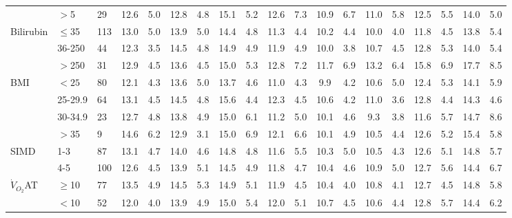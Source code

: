\begin{sidewaystable}[p]
\begin{tabular}{|l ll | cc cc cc cc cc cc cc cc|}
		                    & $>$5      & 29    & 12.6  & 5.0 & 12.8  & 4.8 & 15.1  & 5.2 & 12.6  & 7.3 & 10.9  & 6.7 & 11.0  & 5.8 & 12.5  & 5.5 & 14.0  & 5.0 \\
		Bilirubin           & $\leq$35  & 113   & 13.0  & 5.0 & 13.9  & 5.0 & 14.4  & 4.8 & 11.3  & 4.4 & 10.2  & 4.4 & 10.0  & 4.0 & 11.8  & 4.5 & 13.8  & 5.4 \\
		                    & 36-250    & 44    & 12.3  & 3.5 & 14.5  & 4.8 & 14.9  & 4.9 & 11.9  & 4.9 & 10.0  & 3.8 & 10.7  & 4.5 & 12.8  & 5.3 & 14.0  & 5.4 \\
		                    & $>$250    & 31    & 12.9  & 4.5 & 13.6  & 4.5 & 15.0  & 5.3 & 12.8  & 7.2 & 11.7  & 6.9 & 13.2  & 6.4 & 15.8  & 6.9 & 17.7  & 8.5 \\
		BMI                 & $<25$     & 80    & 12.1  & 4.3 & 13.6  & 5.0 & 13.7  & 4.6 & 11.0  & 4.3 & 9.9   & 4.2 & 10.6  & 5.0 & 12.4  & 5.3 & 14.1  & 5.9 \\
		                    & 25-29.9   & 64    & 13.1  & 4.5 & 14.5  & 4.8 & 15.6  & 4.4 & 12.3  & 4.5 & 10.6  & 4.2 & 11.0  & 3.6 & 12.8  & 4.4 & 14.3  & 4.6 \\
		                    & 30-34.9   & 23    & 12.7  & 4.8 & 13.8  & 4.9 & 15.0  & 6.1 & 11.2  & 5.0 & 10.1  & 4.6 & 9.3   & 3.8 & 11.6  & 5.7 & 14.7  & 8.6 \\
		                    & $>$35     & 9     & 14.6  & 6.2 & 12.9  & 3.1 & 15.0  & 6.9 & 12.1  & 6.6 & 10.1  & 4.9 & 10.5  & 4.4 & 12.6  & 5.2 & 15.4  & 5.8 \\
		SIMD                & 1-3       & 87    & 13.1  & 4.7 & 14.0  & 4.6 & 14.8  & 4.8 & 11.6  & 5.5 & 10.3  & 5.0 & 10.5  & 4.3 & 12.6  & 5.1 & 14.8  & 5.7 \\
		                    & 4-5       & 100   & 12.6  & 4.5 & 13.9  & 5.1 & 14.5  & 4.9 & 11.8  & 4.7 & 10.4  & 4.6 & 10.9  & 5.0 & 12.7  & 5.6 & 14.4  & 6.7 \\
		$\dot{V}_{O_2}$AT   & $\geq$10  & 77    & 13.5  & 4.9 & 14.5  & 5.3 & 14.9  & 5.1 & 11.9  & 4.5 & 10.4  & 4.0 & 10.8  & 4.1 & 12.7  & 4.5 & 14.8  & 5.8 \\
		                    & $<$10     & 52    & 12.0  & 4.0 & 13.9  & 4.9 & 15.0  & 5.4 & 12.0  & 5.1 & 10.7  & 4.5 & 10.6  & 4.4 & 12.8  & 5.7 & 14.4  & 6.2 \\

\end{tabular}
\end{sidewaystable}
